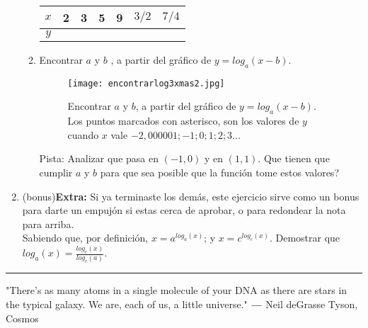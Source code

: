 \documentclass[a4paper,spanish]{exam}
\begin{document}
\begin{enumerate}
\begin{enumerate}
\begin{table}[h]
\centering
\label{my-label}
\begin{tabular}{|c|c|c|c|c|c|c|}
\hline
$x$ & 2 & 3 & 5 & 9 & $3/2$ & $7/4 $  \\ \hline
$y$ & & & & & &  \\ \hline
\end{tabular}
\end{table}


\item  Encontrar $a$ y $b$ ,  a partir del gráfico de $y=log_a(x-b)$.



\begin{figure}[h!]
\centering
\texttt{[image: encontrarlog3xmas2.jpg]}
\caption{Encontrar $a$ y $b$,  a partir del gráfico de $y=log_a(x-b)$.
Los puntos marcados con asterisco, son los valores de $y$ cuando $x$ vale $-2,000001  ;  -1;  0;  1;  2;  3 ... $}
\label{fig:logaritmo}
\end{figure}

Pista: Analizar que pasa en $(-1,0)$ y en $(1,1)$. Que tienen que cumplir $a$ y $b$ para que sea posible que la función tome estos valores?

\end{enumerate}


 \item (bonus)\textbf{Extra:}
 Si ya terminaste los demás, este ejercicio sirve como un bonus para darte un empujón si estas cerca de aprobar, o para redondear la nota para arriba.\\
 
 Sabiendo que, por definición, $x=a^{log_a(x)}$; y $x=c^{log_c(x)}$. Demostrar que $log_a(x)=\frac{log_c(x)}{log_c(a)}$.
 
 \end{enumerate}
 
 \rule[2ex]{\textwidth}{2pt}
 
"There’s as many atoms in a single molecule of your DNA as there are stars in the typical galaxy. We are, each of us, a little universe."
$―$ Neil deGrasse Tyson, Cosmos 






\end{document}
